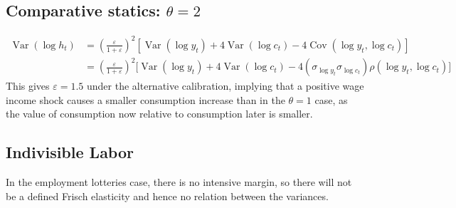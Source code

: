 \documentclass[11pt]{amsart}
\begin{document}
\subsection{Comparative statics: $\theta = 2$}
\begin{align*}
\operatorname{Var}(\log h_t) & = \left( \frac{\varepsilon}{1+ \varepsilon}\right)^2 \left[ \operatorname{Var}(\log y_t) +  4 \operatorname{Var}(\log c_t) - 4 \operatorname{Cov}(\log y_t, \log c_t) \right] \\
& = \left( \frac{\varepsilon}{1+ \varepsilon}\right)^2 \Bigg[ \operatorname{Var}(\log y_t) + 4 \operatorname{Var}(\log c_t) - 4 \left(  \sigma_{\log y_t} \sigma_{\log c_t} \right)\rho(\log y_t, \log c_t) \Bigg]
\end{align*}
This gives $\varepsilon = 1.5$ under the alternative calibration, implying that a positive wage income shock causes a smaller consumption increase than in the $\theta=1$ case, as the value of consumption now relative to consumption later is smaller.

\subsection{Indivisible Labor}
In the employment lotteries case, there is no intensive margin, so there will not be a defined Frisch elasticity and hence no relation between the variances.
\end{document}

